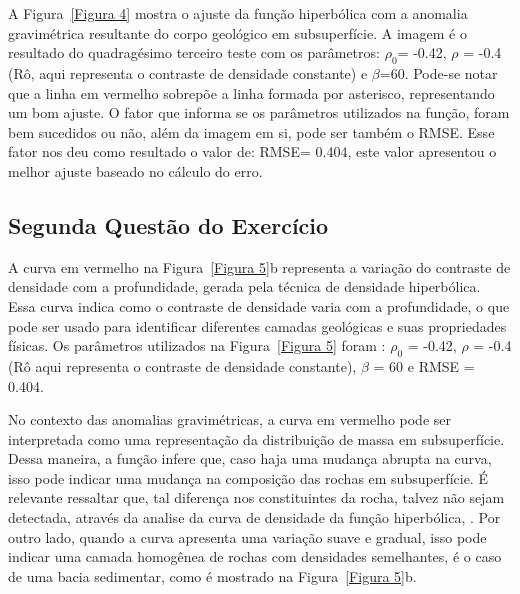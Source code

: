 A Figura~\ref{Figura 4} mostra o ajuste da função hiperbólica com a anomalia gravimétrica resultante do corpo geológico em subsuperfície. A imagem é o resultado do quadragésimo terceiro teste com os parâmetros: $\rho_0$= -0.42, $\rho$ = -0.4 (Rô, aqui representa o contraste de densidade constante) e $\beta$=60. Pode-se notar que a linha em vermelho sobrepõe a linha formada por asterisco, representando um bom ajuste. O fator que informa se os parâmetros utilizados na função, foram bem sucedidos ou não, além da imagem em si, pode ser também o RMSE. Esse fator nos deu como resultado o valor de: RMSE= 0.404, este valor apresentou o melhor ajuste baseado no cálculo do erro.


\subsection{Segunda Questão do Exercício}

A curva em vermelho na Figura~\ref{Figura 5}b representa a variação do contraste de densidade com a profundidade, gerada pela técnica de densidade hiperbólica. Essa curva indica como o contraste de densidade varia com a profundidade, o que pode ser usado para identificar diferentes camadas geológicas e suas propriedades físicas. Os parâmetros utilizados na Figura~\ref{Figura 5} foram : $\rho_0$ = -0.42, $\rho$ = -0.4 (Rô aqui representa o contraste de densidade constante), $\beta$ = 60 e RMSE = 0.404.

No contexto das anomalias gravimétricas, a curva em vermelho pode ser interpretada como uma representação da distribuição de massa em subsuperfície. Dessa maneira, a função infere que, caso haja uma mudança abrupta na curva, isso pode indicar uma mudança na composição das rochas em subsuperfície. É relevante ressaltar que, tal diferença nos constituintes da rocha, talvez não sejam detectada, através da analise da curva de densidade da função hiperbólica, \cite{silva2006gravity}. Por outro lado, quando a curva apresenta uma variação suave e gradual, isso pode indicar uma camada homogênea de rochas com densidades semelhantes, é o caso de uma bacia sedimentar, como é mostrado na Figura~\ref{Figura 5}b.

